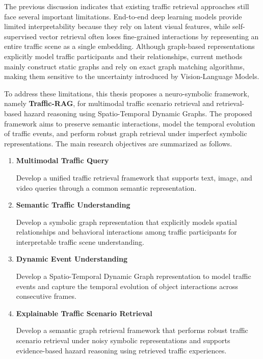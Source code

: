 \documentclass[a4paper, 11pt]{article} %
\begin{document}
The previous discussion indicates that existing traffic retrieval approaches still face several important limitations. End-to-end deep learning models provide limited interpretability because they rely on latent visual features, while self-supervised vector retrieval often loses fine-grained interactions by representing an entire traffic scene as a single embedding. Although graph-based representations explicitly model traffic participants and their relationships, current methods mainly construct static graphs and rely on exact graph matching algorithms, making them sensitive to the uncertainty introduced by Vision-Language Models.

To address these limitations, this thesis proposes a neuro-symbolic framework, namely \textbf{Traffic-RAG}, for multimodal traffic scenario retrieval and retrieval-based hazard reasoning using Spatio-Temporal Dynamic Graphs. The proposed framework aims to preserve semantic interactions, model the temporal evolution of traffic events, and perform robust graph retrieval under imperfect symbolic representations. The main research objectives are summarized as follows.

\begin{enumerate}

\item \textbf{Multimodal Traffic Query}

Develop a unified traffic retrieval framework that supports text, image, and video queries through a common semantic representation.

\item \textbf{Semantic Traffic Understanding}

Develop a symbolic graph representation that explicitly models spatial relationships and behavioral interactions among traffic participants for interpretable traffic scene understanding.

\item \textbf{Dynamic Event Understanding}

Develop a Spatio-Temporal Dynamic Graph representation to model traffic events and capture the temporal evolution of object interactions across consecutive frames.

\item \textbf{Explainable Traffic Scenario Retrieval}

Develop a semantic graph retrieval framework that performs robust traffic scenario retrieval under noisy symbolic representations and supports evidence-based hazard reasoning using retrieved traffic experiences.

\end{enumerate}
\end{document}
